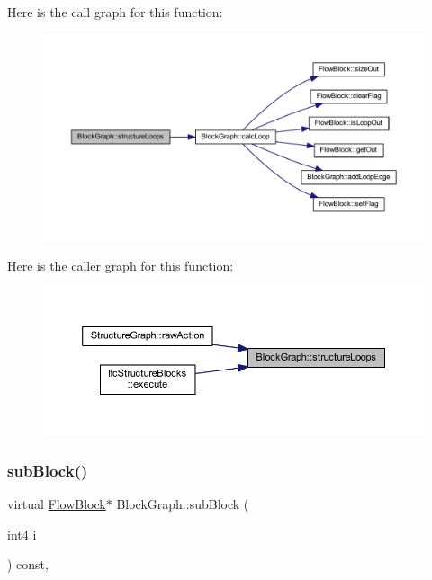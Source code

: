 Here is the call graph for this function\+:
\nopagebreak
\begin{figure}[H]
\begin{center}
\leavevmode
\includegraphics[width=350pt]{class_block_graph_a468717bd5cf1e3bd34e5221a5d425bd9_cgraph}
\end{center}
\end{figure}
Here is the caller graph for this function\+:
\nopagebreak
\begin{figure}[H]
\begin{center}
\leavevmode
\includegraphics[width=350pt]{class_block_graph_a468717bd5cf1e3bd34e5221a5d425bd9_icgraph}
\end{center}
\end{figure}
\mbox{\label{class_block_graph_a57ca5980b8c1ba97c468f82888bf0033}} 
\subsubsection{\texorpdfstring{subBlock()}{subBlock()}}
{\footnotesize\ttfamily virtual \mbox{\hyperlink{class_flow_block}{Flow\+Block}}$\ast$ Block\+Graph\+::sub\+Block (\begin{DoxyParamCaption}\item[{int4}]{i }\end{DoxyParamCaption}) const\hspace{0.3cm}{\ttfamily [inline]}, {\ttfamily [virtual]}}



